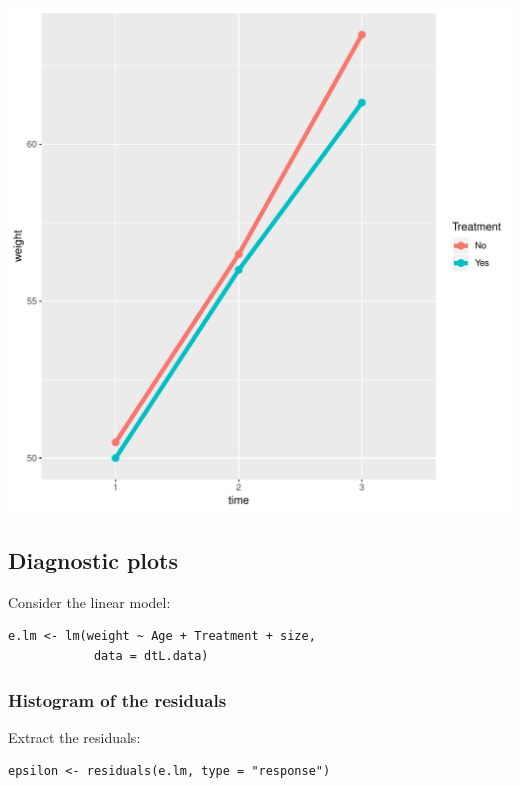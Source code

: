 \documentclass{article}
\begin{document}
\begin{center}
\includegraphics[width=.9\linewidth]{./figures/fig-meanTime.pdf}
\end{center}

\subsection{Diagnostic plots}
\label{sec:org8202e69}

Consider the linear model:
\lstset{language=r,label= ,caption= ,captionpos=b,numbers=none}
\begin{lstlisting}
e.lm <- lm(weight ~ Age + Treatment + size,
			data = dtL.data)
\end{lstlisting}

\subsubsection{Histogram of the residuals}
\label{sec:org9b5d55e}

Extract the residuals:
\lstset{language=r,label= ,caption= ,captionpos=b,numbers=none}
\begin{lstlisting}
epsilon <- residuals(e.lm, type = "response")
\end{lstlisting}
\end{document}
